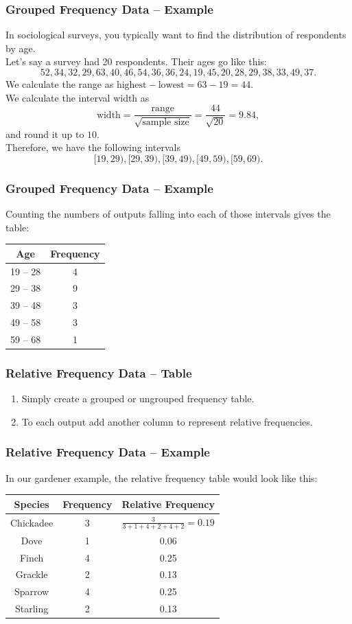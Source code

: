\documentclass[aspectratio=169,11pt,svgnames,handout]{beamer}
\begin{document}
\begin{frame}
 \frametitle{Grouped Frequency Data -- Example}
 In sociological surveys, you typically want to find the distribution of
 respondents by age.\\
 \pause
 Let's say a survey had 20 respondents. Their ages go like this:
 \[
  52, 34, 32, 29, 63, 40, 46, 54, 36, 36, 24, 19, 45, 20, 28, 29, 38, 33, 49,
  37.
 \]
 \pause
 We calculate the range as $\text{highest} - \text{lowest} = 63 - 19 = 44$.\\
 We calculate the interval width as
 \[
  \text{width} = \frac{\text{range}}{\sqrt{\text{sample size}}} =
  \frac{44}{\sqrt{20}} = 9.84,
 \]
 and round it up to $10$.\\
 \pause
 Therefore, we have the following intervals
 \[
  [19, 29), [29, 39), [39, 49), [49, 59), [59, 69).
 \]
\end{frame}

\begin{frame}
 \frametitle{Grouped Frequency Data -- Example}
 Counting the numbers of outputs falling into each of those intervals gives the
 table:
 \begin{center}
  \begin{tabular}{c|c}
   \textbf{Age} & \textbf{Frequency}\\
   \toprule
   19 -- 28 & 4\\
   29 -- 38 & 9\\
   39 -- 48 & 3\\
   49 -- 58 & 3\\
   59 -- 68 & 1
  \end{tabular}
 \end{center}
\end{frame}

\begin{frame}
 \frametitle{Relative Frequency Data -- Table}
 \begin{enumerate}
  \item Simply create a grouped or ungrouped frequency table.
  \pause
  \item To each output add another column to represent \alert{relative
   frequencies}.
 \end{enumerate}
\end{frame}

\begin{frame}
 \frametitle{Relative Frequency Data -- Example}
 In our gardener example, the relative frequency table would look like this:
 \begin{center}
  \begin{tabular}{c|c|c}
   \textbf{Species} & \textbf{Frequency} & \textbf{Relative Frequency}\\
   \toprule
   Chickadee & 3 & $\frac{3}{3 + 1 + 4 + 2 + 4 + 2} = 0.19$\\
   Dove & 1 & 0.06\\
   Finch & 4 & 0.25\\
   Grackle & 2 & 0.13\\
   Sparrow & 4 & 0.25\\
   Starling & 2 & 0.13
  \end{tabular}
 \end{center}
\end{frame}
\end{document}
